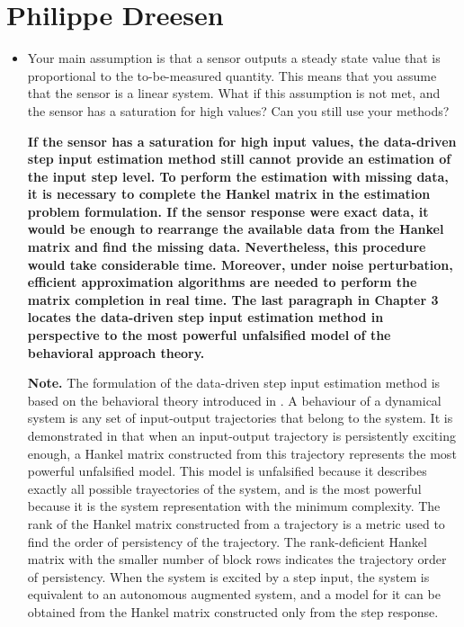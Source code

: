 \documentclass[11pt]{article}
\begin{document}
\section*{Philippe Dreesen}

\begin{itemize}
	\item Your main assumption is that a sensor outputs a steady state value that is proportional to the to-be-measured quantity. This means that you assume that the sensor is a linear system. What if this assumption is not met, and the sensor has a saturation for high values? Can you still use your methods?
	
	{\bfseries If the sensor has a saturation for high input values, the data-driven step input estimation method still cannot provide an estimation of the input step level. To perform the estimation with missing data, it is necessary to complete the Hankel matrix in the estimation problem formulation. If the sensor response were exact data, it would be enough to rearrange the available data from the Hankel matrix and find the missing data. Nevertheless, this procedure would take considerable time. Moreover, under noise perturbation, efficient approximation algorithms are needed to perform the matrix completion in real time. The last paragraph in Chapter 3 locates the data-driven step input estimation method in perspective to the most powerful unfalsified model of the behavioral approach theory.  }
		
	\color{blue}
    {\bfseries Note.} The formulation of the data-driven step input estimation method is based on the behavioral theory introduced in \cite{Willems86I}.
    A behaviour of a dynamical system is any set of input-output trajectories that belong to the system. 
    It is demonstrated in \cite{Willems05} that when an input-output trajectory is persistently exciting enough, a Hankel matrix constructed from this trajectory represents the most powerful unfalsified model.
    This model is unfalsified because it describes exactly all possible trayectories of the system, and is the most powerful because it is the system representation with the minimum complexity.     
    The rank of the Hankel matrix constructed from a trajectory is a metric used to find the order of persistency of the trajectory.
    The rank-deficient Hankel matrix with the smaller number of block rows indicates the trajectory order of persistency. %
    When the system is excited by a step input, the system is equivalent to an autonomous augmented system, and a model for it can be obtained from the Hankel matrix constructed only from the step response.  
    \color{black}


\end{itemize}
\end{document}
